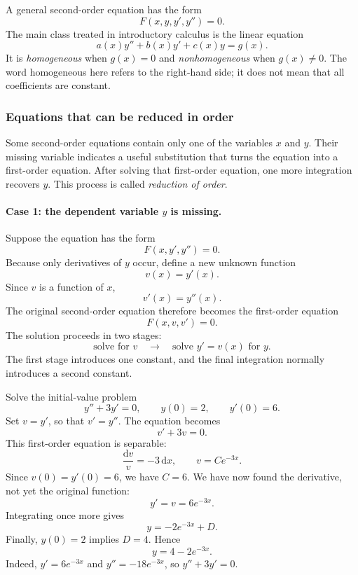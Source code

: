 A general second-order equation has the form
\[
    F(x,y,y',y'')=0.
\]
The main class treated in introductory calculus is the linear equation
\[
    a(x)y''+b(x)y'+c(x)y=g(x).
\]
It is \emph{homogeneous} when \(g(x)=0\) and \emph{nonhomogeneous} when
\(g(x)\neq0\).  The word homogeneous here refers to the right-hand side;
it does not mean that all coefficients are constant.

\subsubsection{Equations that can be reduced in order}

Some second-order equations contain only one of the variables \(x\) and
\(y\).  Their missing variable indicates a useful substitution that turns
the equation into a first-order equation.  After solving that first-order
equation, one more integration recovers \(y\).  This process is called
\emph{reduction of order}.

\paragraph{Case 1: the dependent variable \(y\) is missing.}
Suppose the equation has the form
\[
    F(x,y',y'')=0.
\]
Because only derivatives of \(y\) occur, define a new unknown function
\[
    v(x)=y'(x).
\]
Since \(v\) is a function of \(x\),
\[
    v'(x)=y''(x).
\]
The original second-order equation therefore becomes the first-order
equation
\[
    F(x,v,v')=0.
\]
The solution proceeds in two stages:
\[
    \boxed{
        \text{solve for \(v\)}
        \quad\longrightarrow\quad
        \text{solve \(y'=v(x)\) for \(y\)}.}
\]
The first stage introduces one constant, and the final integration normally
introduces a second constant.

\begin{eg}
    Solve the initial-value problem
    \[
        y''+3y'=0,
        \qquad y(0)=2,
        \qquad y'(0)=6.
    \]
    Set \(v=y'\), so that \(v'=y''\).  The equation becomes
    \[
        v'+3v=0.
    \]
    This first-order equation is separable:
    \[
        \frac{\mathrm{d}v}{v}=-3\,\mathrm{d}x,
        \qquad
        v=Ce^{-3x}.
    \]
    Since \(v(0)=y'(0)=6\), we have \(C=6\).  We have now found the
    derivative, not yet the original function:
    \[
        y'=v=6e^{-3x}.
    \]
    Integrating once more gives
    \[
        y=-2e^{-3x}+D.
    \]
    Finally, \(y(0)=2\) implies \(D=4\).  Hence
    \[
        \boxed{y=4-2e^{-3x}}.
    \]
    Indeed, \(y'=6e^{-3x}\) and \(y''=-18e^{-3x}\), so
    \(y''+3y'=0\).
\end{eg}

